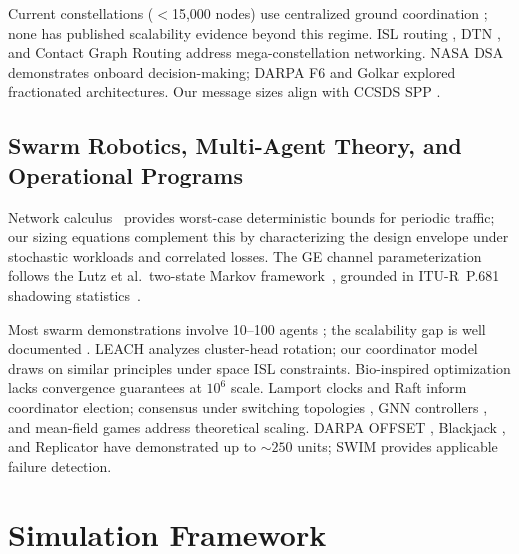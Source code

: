 \documentclass[journal]{IEEEtran}
\begin{document}
Current constellations ($<$15{,}000 nodes) use centralized ground coordination \cite{starlink_ops, esa_conjunction, oneweb_mgmt}; none has published scalability evidence beyond this regime. ISL routing \cite{iridium_arch, handley_2018, del_portillo_mega, bhattacherjee_isl}, DTN \cite{cerf_dtn, ccsds_bpv7}, and Contact Graph Routing \cite{fraire_cgr} address mega-constellation networking. NASA DSA \cite{nasa_dsa} demonstrates onboard decision-making; DARPA F6 \cite{darpa_f6} and Golkar \cite{golkar_federated} explored fractionated architectures. Our message sizes align with CCSDS SPP \cite{ccsds_spp}.

\subsection{Swarm Robotics, Multi-Agent Theory, and Operational Programs}

Network calculus~\cite{leboudec_netcalc} provides worst-case deterministic bounds for periodic traffic; our sizing equations complement this by characterizing the design envelope under stochastic workloads and correlated losses. The GE channel parameterization follows the Lutz et al.\ two-state Markov framework~\cite{lutz_1991}, grounded in ITU-R~P.681 shadowing statistics~\cite{itu_p681}.

Most swarm demonstrations involve 10--100 agents \cite{brambilla_2013}; the scalability gap is well documented \cite{dorigo_2021}. LEACH \cite{heinzelman_leach} analyzes cluster-head rotation; our coordinator model draws on similar principles under space ISL constraints. Bio-inspired optimization \cite{dorigo_aco, kennedy_pso, karaboga_abc} lacks convergence guarantees at $10^6$ scale. Lamport clocks \cite{lamport_clocks} and Raft \cite{ongaro_raft} inform coordinator election; consensus under switching topologies \cite{olfati_consensus, ren_beard}, GNN controllers \cite{tolstaya_gnn, li_decentralized}, and mean-field games \cite{lasry_mfg, huang_mfg} address theoretical scaling. DARPA OFFSET \cite{darpa_offset}, Blackjack \cite{darpa_blackjack}, and Replicator \cite{dod_replicator} have demonstrated up to ${\sim}250$ units; SWIM \cite{das_swim} provides applicable failure detection.


\section{Simulation Framework}
\end{document}
